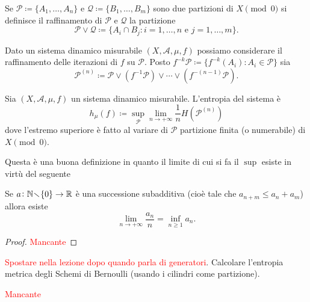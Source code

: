 \begin{definition}
    Se $ \mathcal{P} \coloneqq \{A_1, \ldots, A_n\} $ e $ \mathcal{Q} \coloneqq \{B_1, \ldots, B_m\} $ sono due partizioni di $ X \pmod{0} $ si definisce il raffinamento di $ \mathcal{P} $ e $ \mathcal{Q} $ la partizione
    \[
        \mathcal{P} \vee \mathcal{Q} \coloneqq \{A_i \cap B_j : i = 1, \ldots, n \text{ e } j = 1, \ldots, m\}.
    \]
\end{definition}

Dato un sistema dinamico misurabile $ (X, \mathcal{A}, \mu, f) $ possiamo considerare il raffinamento delle iterazioni di $ f $ su $ \mathcal{P} $. Posto $ f^{-k}\mathcal{P} \coloneqq \{f^{-k}(A_i) : A_i \in \mathcal{P}\} $ sia
\[
    \mathcal{P}^{(n)} \coloneqq \mathcal{P} \vee (f^{-1}\mathcal{P}) \vee \cdots \vee (f^{-(n-1)}\mathcal{P}).
\]

\begin{definition}
    Sia $ (X, \mathcal{A}, \mu, f) $ un sistema dinamico misurabile. L'entropia del sistema è
    \[
        h_\mu(f) \coloneqq \sup_\mathcal{P} {\lim_{n \to +\infty} \frac{1}{n}H(\mathcal{P}^{(n)})}
    \]
    dove l'estremo superiore è fatto al variare di $ \mathcal{P} $ partizione finita (o numerabile) di $ X \pmod{0} $.
\end{definition}
Questa è una buona definizione in quanto il limite di cui si fa il $ \sup $ esiste in virtù del seguente
\begin{lemma}[Fekete]
    Se $ a \colon \mathbb{N}\!\smallsetminus\!\{0\} \to \mathbb{R} $ è una successione subadditiva (cioè tale che $ a_{n+m} \leq a_n + a_m $) allora esiste
    \[
        \lim_{n\to+\infty} \frac{a_n}{n} = \inf_{n\geq1}a_n.
    \]
\end{lemma}
\begin{proof}
    \textcolor{red}{Mancante}
\end{proof}

\begin{exercise}
    \textcolor{red}{Spostare nella lezione dopo quando parla di generatori}.
    Calcolare l'entropia metrica degli Schemi di Bernoulli (usando i cilindri come partizione).
\end{exercise}
\begin{solution}
    \textcolor{red}{Mancante}
\end{solution}
